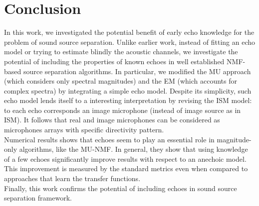 
\section{Conclusion}
In this work, we investigated the potential benefit of early echo knowledge for the problem of sound source separation.
Unlike earlier work, instead of fitting an echo model or trying to estimate blindly the acoustic channels,
we investigate the potential of including the properties of known echoes in well established \ac{NMF}-based source separation algorithms.
In particular, we modified the \ac{MU} approach (which considers only spectral magnitudes) and the \ac{EM} (which accounts for complex spectra) by integrating a simple echo model.
Despite its simplicity, such echo model lends itself to a interesting interpretation by revising the \ac{ISM} model:
to each echo corresponds an image microphone (instead of image source as in \ac{ISM}).
It follows that real and image microphones can be considered as microphones arrays with specific directivity pattern.
\\Numerical results shows that echoes seem to play an essential role in magnitude-only algorithms, like the \ac{MU}-\ac{NMF}.
In general, they show that using knowledge of a few echoes significantly improve results with respect to an anechoic model.
This improvement is measured by the standard metrics even when compared to approaches that learn the transfer functions.
\\Finally, this work confirms the potential of including echoes in sound source separation framework.

